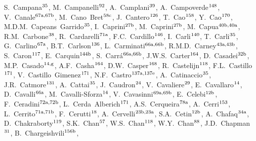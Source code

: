 \begin{flushleft}
S.~Campana$^\textrm{\scriptsize 35}$,    
M.~Campanelli$^\textrm{\scriptsize 92}$,    
A.~Camplani$^\textrm{\scriptsize 39}$,    
A.~Campoverde$^\textrm{\scriptsize 148}$,    
V.~Canale$^\textrm{\scriptsize 67a,67b}$,    
M.~Cano~Bret$^\textrm{\scriptsize 58c}$,    
J.~Cantero$^\textrm{\scriptsize 126}$,    
T.~Cao$^\textrm{\scriptsize 158}$,    
Y.~Cao$^\textrm{\scriptsize 170}$,    
M.D.M.~Capeans~Garrido$^\textrm{\scriptsize 35}$,    
I.~Caprini$^\textrm{\scriptsize 27b}$,    
M.~Caprini$^\textrm{\scriptsize 27b}$,    
M.~Capua$^\textrm{\scriptsize 40b,40a}$,    
R.M.~Carbone$^\textrm{\scriptsize 38}$,    
R.~Cardarelli$^\textrm{\scriptsize 71a}$,    
F.C.~Cardillo$^\textrm{\scriptsize 146}$,    
I.~Carli$^\textrm{\scriptsize 140}$,    
T.~Carli$^\textrm{\scriptsize 35}$,    
G.~Carlino$^\textrm{\scriptsize 67a}$,    
B.T.~Carlson$^\textrm{\scriptsize 136}$,    
L.~Carminati$^\textrm{\scriptsize 66a,66b}$,    
R.M.D.~Carney$^\textrm{\scriptsize 43a,43b}$,    
S.~Caron$^\textrm{\scriptsize 117}$,    
E.~Carquin$^\textrm{\scriptsize 144b}$,    
S.~Carr\'a$^\textrm{\scriptsize 66a,66b}$,    
J.W.S.~Carter$^\textrm{\scriptsize 164}$,    
D.~Casadei$^\textrm{\scriptsize 32b}$,    
M.P.~Casado$^\textrm{\scriptsize 14,g}$,    
A.F.~Casha$^\textrm{\scriptsize 164}$,    
D.W.~Casper$^\textrm{\scriptsize 168}$,    
R.~Castelijn$^\textrm{\scriptsize 118}$,    
F.L.~Castillo$^\textrm{\scriptsize 171}$,    
V.~Castillo~Gimenez$^\textrm{\scriptsize 171}$,    
N.F.~Castro$^\textrm{\scriptsize 137a,137e}$,    
A.~Catinaccio$^\textrm{\scriptsize 35}$,    
J.R.~Catmore$^\textrm{\scriptsize 131}$,    
A.~Cattai$^\textrm{\scriptsize 35}$,    
J.~Caudron$^\textrm{\scriptsize 24}$,    
V.~Cavaliere$^\textrm{\scriptsize 29}$,    
E.~Cavallaro$^\textrm{\scriptsize 14}$,    
D.~Cavalli$^\textrm{\scriptsize 66a}$,    
M.~Cavalli-Sforza$^\textrm{\scriptsize 14}$,    
V.~Cavasinni$^\textrm{\scriptsize 69a,69b}$,    
E.~Celebi$^\textrm{\scriptsize 12b}$,    
F.~Ceradini$^\textrm{\scriptsize 72a,72b}$,    
L.~Cerda~Alberich$^\textrm{\scriptsize 171}$,    
A.S.~Cerqueira$^\textrm{\scriptsize 78a}$,    
A.~Cerri$^\textrm{\scriptsize 153}$,    
L.~Cerrito$^\textrm{\scriptsize 71a,71b}$,    
F.~Cerutti$^\textrm{\scriptsize 18}$,    
A.~Cervelli$^\textrm{\scriptsize 23b,23a}$,    
S.A.~Cetin$^\textrm{\scriptsize 12b}$,    
A.~Chafaq$^\textrm{\scriptsize 34a}$,    
D.~Chakraborty$^\textrm{\scriptsize 119}$,    
S.K.~Chan$^\textrm{\scriptsize 57}$,    
W.S.~Chan$^\textrm{\scriptsize 118}$,    
W.Y.~Chan$^\textrm{\scriptsize 88}$,    
J.D.~Chapman$^\textrm{\scriptsize 31}$,    
B.~Chargeishvili$^\textrm{\scriptsize 156b}$,    

\end{flushleft}
